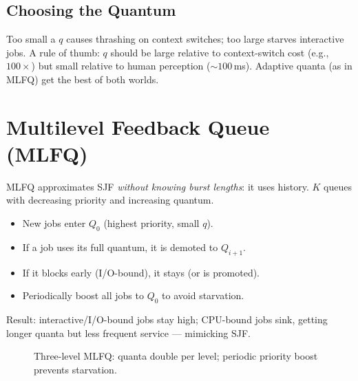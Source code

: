 \subsection{Choosing the Quantum}
Too small a $q$ causes thrashing on context switches; too large starves
interactive jobs. A rule of thumb: $q$ should be large relative to context-switch
cost (e.g., $100\times$) but small relative to human perception ($\sim 100$\,ms).
Adaptive quanta (as in MLFQ) get the best of both worlds.

\section{Multilevel Feedback Queue (MLFQ)}
\label{sec:mlfq}

MLFQ approximates SJF \emph{without knowing burst lengths}: it uses history.
$K$ queues with decreasing priority and increasing quantum.

\begin{itemize}
  \item New jobs enter $Q_0$ (highest priority, small $q$).
  \item If a job uses its full quantum, it is demoted to $Q_{i+1}$.
  \item If it blocks early (I/O-bound), it stays (or is promoted).
  \item Periodically boost all jobs to $Q_0$ to avoid starvation.
\end{itemize}
Result: interactive/I/O-bound jobs stay high; CPU-bound jobs sink, getting
longer quanta but less frequent service --- mimicking SJF.

\begin{figure}[h!]
\centering
{}
\caption{Three-level MLFQ: quanta double per level; periodic priority boost prevents starvation.}
\label{fig:mlfq}
\end{figure}

